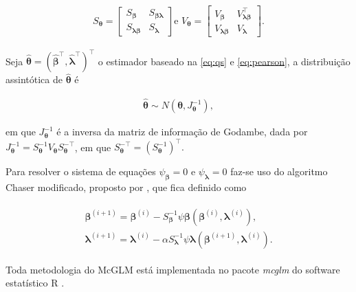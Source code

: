 $$
      \begin{aligned}
S_{\boldsymbol{\theta}} = \begin{bmatrix}
S_{\boldsymbol{\beta}} & S_{\boldsymbol{\beta\lambda}} \\ 
S_{\boldsymbol{\lambda\beta}} & S_{\boldsymbol{\lambda}} 
\end{bmatrix} \text{e } V_{\boldsymbol{\theta}} = \begin{bmatrix}
V_{\boldsymbol{\beta}} & V^{\top}_{\boldsymbol{\lambda\beta}} \\ 
V_{\boldsymbol{\lambda\beta}} & V_{\boldsymbol{\lambda}} 
\end{bmatrix}.
\end{aligned}
$$

Seja $\boldsymbol{\hat{\theta}} = (\boldsymbol{\hat{\beta}^{\top}}, \boldsymbol{\hat{\lambda}^{\top}})^{\top}$ o estimador baseado na \autoref{eq:qs} e \autoref{eq:pearson}, a distribuição assintótica de $\boldsymbol{\hat{\theta}}$ é

$$
\begin{aligned}
\boldsymbol{\hat{\theta}} \sim N(\boldsymbol{\theta}, J_{\boldsymbol{\theta}}^{-1}),
\end{aligned}
$$

\noindent em que $J_{\boldsymbol{\theta}}^{-1}$ é a inversa da matriz de informação de Godambe, dada por
$J_{\boldsymbol{\theta}}^{-1} = S_{\boldsymbol{\theta}}^{-1} V_{\boldsymbol{\theta}} S_{\boldsymbol{\theta}}^{-\top}$, em que $S_{\boldsymbol{\theta}}^{-\top} = (S_{\boldsymbol{\theta}}^{-1})^{\top}.$

Para resolver o sistema de equações $\psi_{\boldsymbol{\beta}} = 0$ e $\psi_{\boldsymbol{\lambda}} = 0$ faz-se uso do algoritmo Chaser modificado, proposto por \citet{jorg04}, que fica definido como

$$
\begin{aligned}
\begin{matrix}
\boldsymbol{\beta}^{(i+1)} = \boldsymbol{\beta}^{(i)}- S_{\boldsymbol{\beta}}^{-1} \psi \boldsymbol{\beta} (\boldsymbol{\beta}^{(i)}, \boldsymbol{\lambda}^{(i)}), \\ 
\boldsymbol{\lambda}^{(i+1)} = \boldsymbol{\lambda}^{(i)} - \alpha S_{\boldsymbol{\lambda}}^{-1} \psi \boldsymbol{\lambda} (\boldsymbol{\beta}^{(i+1)}, \boldsymbol{\lambda}^{(i)}).
\end{matrix}
\end{aligned}
$$

Toda metodologia do McGLM está implementada no pacote \emph{mcglm} \citep{mcglm} do software estatístico R \citep{softwareR}.

